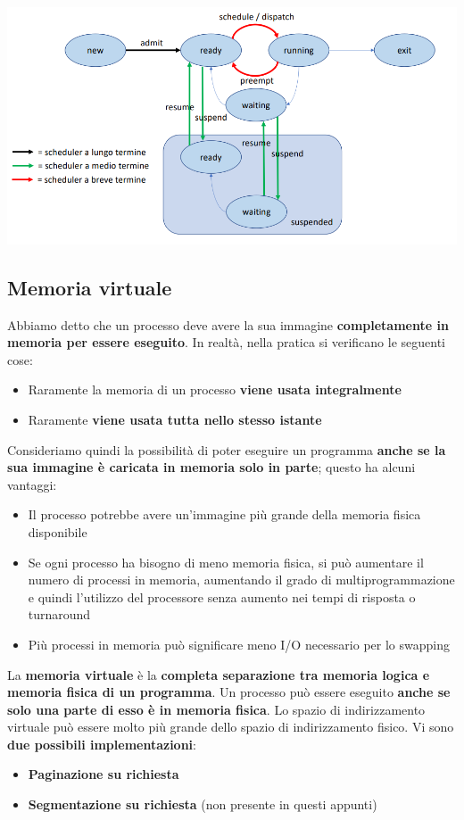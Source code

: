 \documentclass[12pt]{article}
\begin{document}
\begin{center}
    \includegraphics[width = 1\linewidth]{Images/68.png}
\end{center}
\subsection{Memoria virtuale}
Abbiamo detto che un processo deve avere la sua immagine \textbf{completamente in memoria per essere eseguito}.
In realtà, nella pratica si verificano le seguenti cose:
\begin{itemize}
    \item Raramente la memoria di un processo \textbf{viene usata integralmente}
    \item Raramente \textbf{viene usata tutta nello stesso istante}
\end{itemize}
Consideriamo quindi la possibilità di poter eseguire un programma \textbf{anche se la sua immagine è caricata in memoria solo in parte}; questo ha alcuni vantaggi:
\begin{itemize}
    \item Il processo potrebbe avere un'immagine più grande della memoria fisica disponibile
    \item Se ogni processo ha bisogno di meno memoria fisica, si può aumentare il numero di processi in memoria, aumentando il grado di multiprogrammazione e quindi l'utilizzo del processore senza aumento nei tempi di risposta o turnaround
    \item Più processi in memoria può significare meno I/O necessario per lo swapping
\end{itemize}
La \textbf{memoria virtuale} è la \textbf{completa separazione tra memoria logica e memoria fisica di un programma}.
Un processo può essere eseguito \textbf{anche se solo una parte di esso è in memoria fisica}.
Lo spazio di indirizzamento virtuale può essere molto più grande dello spazio di indirizzamento fisico.
Vi sono \textbf{due possibili implementazioni}:
\begin{itemize}
    \item \textbf{Paginazione su richiesta}
    \item \textbf{Segmentazione su richiesta} (non presente in questi appunti)
\end{itemize}
\end{document}
